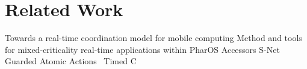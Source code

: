 \documentclass[sigconf]{acmart}
\newcommand{\martin}[1]{\mynote{Martin}{#1}{blue}}%
\newcommand{\marten}[1]{\mynote{Marten}{#1}{cyan}}%
\begin{document}
\section{Related Work}
\label{sec:related}

Towards a real-time coordination model for mobile computing \cite{hackmann2005towards}
Method and tools for mixed-criticality real-time applications within PharOS \cite{lemerre2011method}
Accessors \cite{brooks2018component}
S-Net~\cite{grelck2008gentle}
Guarded Atomic Actions~\cite{Rosenband:2004:MSG:996566.996583}
Timed C \cite{Broman_timedC}
%








\end{document}
